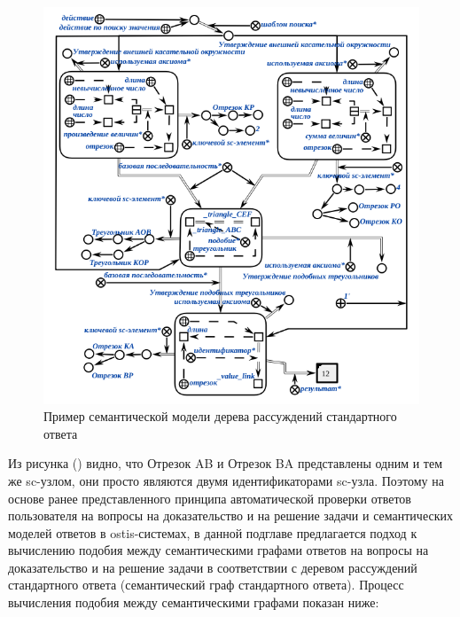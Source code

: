 \begin{figure}[H]
	\includegraphics[scale=0.6]{author/part7/figures/inference_tree_example_SCg.png}
	\caption{Пример семантической модели дерева рассуждений стандартного ответа}
	\label{fig:ITE_example}
\end{figure}

Из рисунка (\textit{}) видно, что Отрезок AB и Отрезок BA представлены одним и тем же sc-узлом, они просто являются двумя идентификаторами sc-узла. Поэтому на основе ранее представленного принципа автоматической проверки ответов пользователя на вопросы на доказательство и на решение задачи и семантических моделей ответов в ostis-системах, в данной подглаве предлагается подход к вычислению подобия между семантическими графами ответов на вопросы на доказательство и на решение задачи в соответствии с деревом рассуждений стандартного ответа (семантический граф стандартного ответа). Процесс вычисления подобия между семантическими графами показан ниже:

